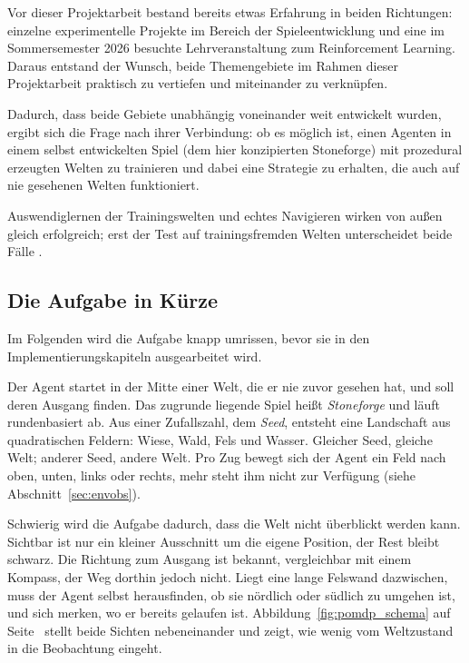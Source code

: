 \documentclass[11pt,a4paper]{article}
\begin{document}
Vor dieser Projektarbeit bestand bereits etwas Erfahrung in beiden
Richtungen: einzelne experimentelle Projekte im Bereich der
Spieleentwicklung und eine im Sommersemester 2026 besuchte
Lehrveranstaltung zum Reinforcement Learning. Daraus entstand der Wunsch, beide Themengebiete im Rahmen dieser
Projektarbeit praktisch zu vertiefen und miteinander zu verknüpfen.

Dadurch, dass beide Gebiete unabhängig voneinander weit entwickelt wurden,
ergibt sich die Frage nach ihrer Verbindung: ob es möglich ist, einen Agenten
in einem selbst entwickelten Spiel (dem hier konzipierten Stoneforge) mit
prozedural erzeugten Welten zu trainieren und dabei eine Strategie zu
erhalten, die auch auf nie gesehenen Welten funktioniert.

Auswendiglernen der Trainingswelten und echtes Navigieren wirken von außen
gleich erfolgreich; erst der Test auf trainingsfremden Welten unterscheidet
beide Fälle \cite{cobbe2020procgen}.

\subsection{Die Aufgabe in Kürze}
\label{sec:aufgabe_kurz}

Im Folgenden wird die Aufgabe knapp umrissen, bevor sie in den
Implementierungskapiteln ausgearbeitet wird.

Der Agent startet in der Mitte einer Welt, die er nie zuvor gesehen hat, und
soll deren Ausgang finden. Das zugrunde liegende Spiel heißt \emph{Stoneforge}
und läuft rundenbasiert ab. Aus einer Zufallszahl, dem \emph{Seed}, entsteht
eine Landschaft aus quadratischen Feldern: Wiese, Wald, Fels und Wasser.
Gleicher Seed, gleiche Welt; anderer Seed, andere Welt. Pro Zug bewegt sich der
Agent ein Feld nach oben, unten, links oder rechts, mehr steht ihm nicht zur
Verfügung (siehe Abschnitt~\ref{sec:envobs}).

Schwierig wird die Aufgabe dadurch, dass die Welt nicht überblickt werden kann.
Sichtbar ist nur ein kleiner Ausschnitt um die eigene Position, der Rest bleibt
schwarz. Die Richtung zum Ausgang ist bekannt, vergleichbar mit einem Kompass,
der Weg dorthin jedoch nicht. Liegt eine lange Felswand dazwischen, muss der
Agent selbst herausfinden, ob sie nördlich oder südlich zu umgehen ist, und
sich merken, wo er bereits gelaufen ist.
Abbildung~\ref{fig:pomdp_schema} auf Seite~\pageref{fig:pomdp_schema} stellt
beide Sichten nebeneinander und zeigt, wie wenig vom Weltzustand in die
Beobachtung eingeht.
\end{document}
